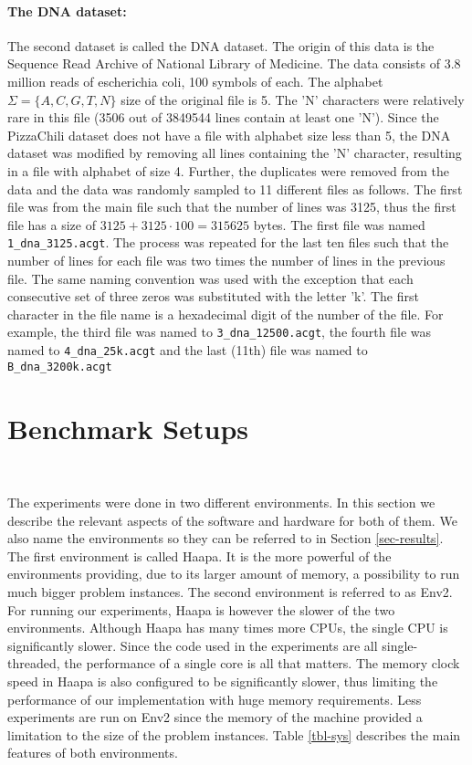 \documentclass[english,twoside,censored,csm,algorithms-track-2020]{HYthesisML}
\theoremstyle{plain}
\theoremstyle{definition}
\begin{document}
\paragraph{The DNA dataset:}
The second dataset is called the DNA dataset. The origin of this data is the Sequence Read Archive
of National Library of Medicine. The data consists of 3.8 million reads of escherichia coli,
100 symbols of each.
 The alphabet $\Sigma=\{A,C,G,T,N\}$ size of the original file is 5.
The 'N' characters were relatively rare in this file (3506 out of 3849544 lines contain at least one 'N').
Since the PizzaChili dataset does not have a
file with alphabet size less than 5, the DNA dataset was modified by removing all lines containing
the 'N' character, resulting in a file with alphabet of size 4.
Further, the duplicates were removed from the data and the data was randomly sampled to 11 different
files as follows. The first file was from the main file such that the number of lines was 3125, thus
the first file has a size of $3125+3125\cdot 100 = 315625$ bytes. The first file was named
\texttt{1\_dna\_3125.acgt}. The process was repeated for the last ten files such that the number
of lines for each file was two times the number of lines in the previous file.
The same naming convention
was used with the exception that each consecutive set of three zeros was substituted with the letter 'k'.
The first character in the file name is a hexadecimal digit of the number of the file.
For example, the third file was named to \texttt{3\_dna\_12500.acgt}, the fourth file was named
to \texttt{4\_dna\_25k.acgt} and the last (11th) file was named to \texttt{B\_dna\_3200k.acgt}

\section{Benchmark Setups}~\label{sec-env}

The experiments were done in two different environments. In this section we describe the relevant
aspects of the software and hardware for both of them. We also name the environments so they
can be referred to in Section \ref{sec-results}. The first environment is called Haapa. It is the more
powerful of the environments providing, due to its larger amount of memory, a possibility to run
much bigger problem instances. The second
environment is referred to as Env2. For running
our experiments, Haapa is however the slower of the two environments. Although Haapa has many times
more CPUs, the single CPU is significantly slower. Since the code used in the experiments
are all single-threaded, the performance of a single core is all that matters. The memory
clock speed in Haapa is also configured to be significantly slower, thus limiting the performance
of our implementation with huge memory requirements. Less experiments are run on Env2 since the
memory of the machine provided a limitation to the size of the problem instances.
Table \ref{tbl-sys} describes the main features of both environments.
\end{document}
